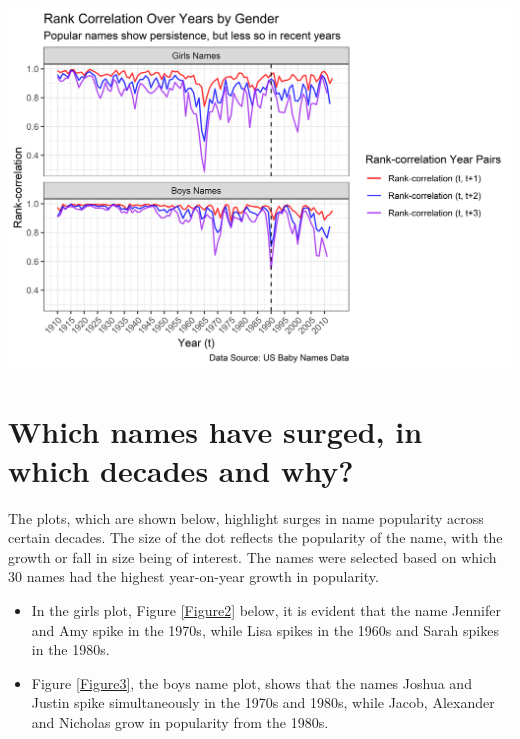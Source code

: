 \documentclass[11pt,preprint, authoryear]{elsarticle}
\let\origfigure\figure
\let\endorigfigure\endfigure
\renewenvironment{figure}[1][2] {
    \expandafter\origfigure\expandafter[H]
} {
    \endorigfigure
}
\numberwithin{equation}{section}
\numberwithin{figure}{section}
\numberwithin{table}{section}
\begin{document}
\begin{figure}[H]

{\centering \includegraphics{Question_1_files/figure-latex/Figure1-1} 

}

\caption{Persistence of Popular Names \label{Figure1}}\label{fig:Figure1}
\end{figure}

\newpage

\hypertarget{which-names-have-surged-in-which-decades-and-why}{%
\section{\texorpdfstring{Which names have surged, in which decades and
why?
\label{surge}}{Which names have surged, in which decades and why? }}\label{which-names-have-surged-in-which-decades-and-why}}

The plots, which are shown below, highlight surges in name popularity
across certain decades. The size of the dot reflects the popularity of
the name, with the growth or fall in size being of interest. The names
were selected based on which 30 names had the highest year-on-year
growth in popularity.

\begin{itemize}
\item
  In the girls plot, Figure \ref{Figure2} below, it is evident that the
  name Jennifer and Amy spike in the 1970s, while Lisa spikes in the
  1960s and Sarah spikes in the 1980s.
\item
  Figure \ref{Figure3}, the boys name plot, shows that the names Joshua
  and Justin spike simultaneously in the 1970s and 1980s, while Jacob,
  Alexander and Nicholas grow in popularity from the 1980s.
\end{itemize}
\end{document}
